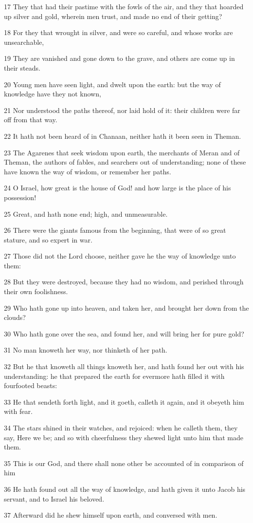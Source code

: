 \par 17 They that had their pastime with the fowls of the air, and they that hoarded up silver and gold, wherein men trust, and made no end of their getting?
\par 18 For they that wrought in silver, and were so careful, and whose works are unsearchable,
\par 19 They are vanished and gone down to the grave, and others are come up in their steads.
\par 20 Young men have seen light, and dwelt upon the earth: but the way of knowledge have they not known,
\par 21 Nor understood the paths thereof, nor laid hold of it: their children were far off from that way.
\par 22 It hath not been heard of in Chanaan, neither hath it been seen in Theman.
\par 23 The Agarenes that seek wisdom upon earth, the merchants of Meran and of Theman, the authors of fables, and searchers out of understanding; none of these have known the way of wisdom, or remember her paths.
\par 24 O Israel, how great is the house of God! and how large is the place of his possession!
\par 25 Great, and hath none end; high, and unmeasurable.
\par 26 There were the giants famous from the beginning, that were of so great stature, and so expert in war.
\par 27 Those did not the Lord choose, neither gave he the way of knowledge unto them:
\par 28 But they were destroyed, because they had no wisdom, and perished through their own foolishness.
\par 29 Who hath gone up into heaven, and taken her, and brought her down from the clouds?
\par 30 Who hath gone over the sea, and found her, and will bring her for pure gold?
\par 31 No man knoweth her way, nor thinketh of her path.
\par 32 But he that knoweth all things knoweth her, and hath found her out with his understanding: he that prepared the earth for evermore hath filled it with fourfooted beasts:
\par 33 He that sendeth forth light, and it goeth, calleth it again, and it obeyeth him with fear.
\par 34 The stars shined in their watches, and rejoiced: when he calleth them, they say, Here we be; and so with cheerfulness they shewed light unto him that made them.
\par 35 This is our God, and there shall none other be accounted of in comparison of him
\par 36 He hath found out all the way of knowledge, and hath given it unto Jacob his servant, and to Israel his beloved.
\par 37 Afterward did he shew himself upon earth, and conversed with men.


